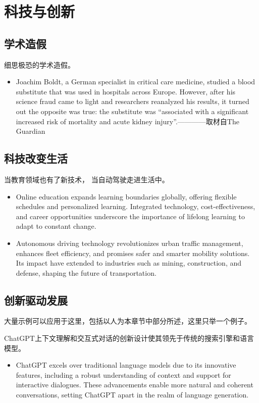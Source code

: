 \section{科技与创新}
\subsection{学术造假}
细思极恐的学术造假。
\begin{itemize}
    \item Joachim Boldt, a German specialist in critical care medicine, studied a blood substitute that was used in hospitals across Europe. However, after his science fraud came to light and researchers reanalyzed his results, it turned out the opposite was true: the substitute was “associated with a significant increased risk of mortality and acute kidney injury”.————取材自The Guardian
\end{itemize}
\subsection{科技改变生活}
当教育领域也有了新技术，
当自动驾驶走进生活中。
\begin{itemize}
    \item 
Online education expands learning boundaries globally, offering flexible schedules and personalized learning. Integrated technology, cost-effectiveness, and career opportunities underscore the importance of lifelong learning to adapt to constant change.
\item 
Autonomous driving technology revolutionizes urban traffic management, enhances fleet efficiency, and promises safer and smarter mobility solutions. Its impact have extended to industries such as mining, construction, and defense, shaping the future of transportation.
\end{itemize}
\subsection{创新驱动发展}
大量示例可以应用于这里，包括以人为本章节中部分所述，这里只举一个例子。
\par
ChatGPT上下文理解和交互式对话的创新设计使其领先于传统的搜索引擎和语言模型。
\begin{itemize}
    \item ChatGPT excels over traditional language models due to its innovative features, including a robust understanding of context and support for interactive dialogues. These advancements enable more natural and coherent conversations, setting ChatGPT apart in the realm of language generation.
\end{itemize}